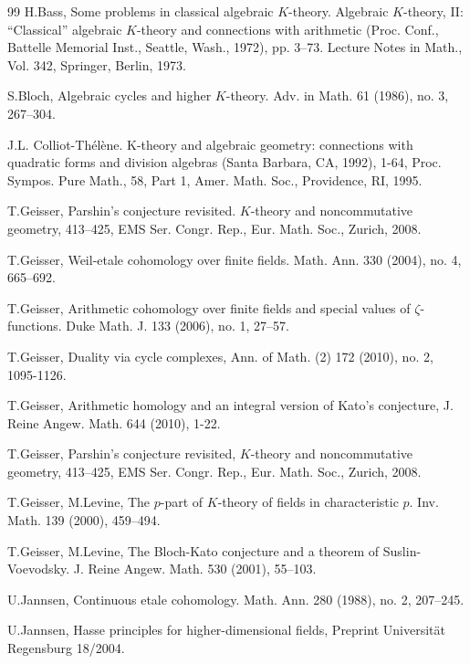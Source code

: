 \documentclass[nospthms,envcountsect]{svmult} %
\begin{document}
\begin{thebibliography}{99}
 {\sc H.Bass}, Some problems in classical algebraic 
$K$-theory. Algebraic $K$-theory, II: ``Classical'' algebraic $K$-theory and 
connections with arithmetic (Proc. Conf., Battelle Memorial Inst., 
Seattle, Wash., 1972), pp. 3--73. Lecture Notes in Math., Vol. 342, 
Springer, Berlin, 1973.

 {\sc S.Bloch}, Algebraic cycles and higher $K$-theory.
Adv. in Math. 61 (1986), no. 3, 267--304.

 {\sc J.L. Colliot-Th\'el\`ene}. K-theory and algebraic geometry: 
connections with quadratic forms and division algebras (Santa Barbara, CA, 1992), 1-64, 
Proc. Sympos. Pure Math., 58, Part 1, Amer. Math. Soc., Providence, RI, 1995.

 {\sc T.Geisser}, Parshin's conjecture revisited. 
$K$-theory and noncommutative geometry, 413--425, 
EMS Ser. Congr. Rep., Eur. Math. Soc., Zurich, 2008.

 {\sc T.Geisser}, Weil-etale cohomology over finite fields. 
Math. Ann. 330 (2004), no. 4, 665--692. 

 {\sc T.Geisser}, Arithmetic cohomology over finite fields 
and special values of $\zeta$-functions. 
Duke Math. J. 133 (2006), no. 1, 27--57.

 {\sc T.Geisser}, Duality via cycle complexes,
Ann. of Math. (2) 172 (2010), no. 2, 1095-1126. 

 {\sc T.Geisser}, Arithmetic homology and an integral version of 
Kato's conjecture, J. Reine Angew. Math. 644 (2010), 1-22.

 {\sc T.Geisser}, Parshin's conjecture revisited,
$K$-theory and noncommutative geometry, 413--425, EMS Ser. Congr. Rep., 
Eur. Math. Soc., Zurich, 2008.

 {\sc T.Geisser, M.Levine}, The $p$-part of
$K$-theory of fields in characteristic $p$. Inv. Math. 139 (2000), 459--494.

 {\sc T.Geisser, M.Levine}, The Bloch-Kato conjecture and a
theorem of Suslin-Voevodsky. J. Reine Angew. Math. 530 (2001), 55--103.

 {\sc U.Jannsen}, 
Continuous etale cohomology. Math. Ann. 280 (1988), no. 2, 207--245.

 {\sc U.Jannsen}, Hasse principles for higher-dimensional
fields, Preprint Universit\"at Regensburg 18/2004.


\end{thebibliography}
\end{document}
